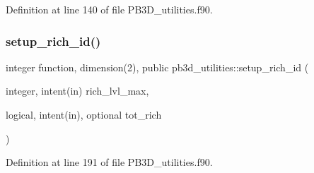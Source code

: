 Definition at line 140 of file P\+B3\+D\+\_\+utilities.\+f90.

\mbox{\label{namespacepb3d__utilities_ab461e756a85b3c6e8fa1ccaa6556c5b0}} 
\subsubsection{\texorpdfstring{setup\+\_\+rich\+\_\+id()}{setup\_rich\_id()}}
{\footnotesize\ttfamily integer function, dimension(2), public pb3d\+\_\+utilities\+::setup\+\_\+rich\+\_\+id (\begin{DoxyParamCaption}\item[{integer, intent(in)}]{rich\+\_\+lvl\+\_\+max,  }\item[{logical, intent(in), optional}]{tot\+\_\+rich }\end{DoxyParamCaption})}



Definition at line 191 of file P\+B3\+D\+\_\+utilities.\+f90.

